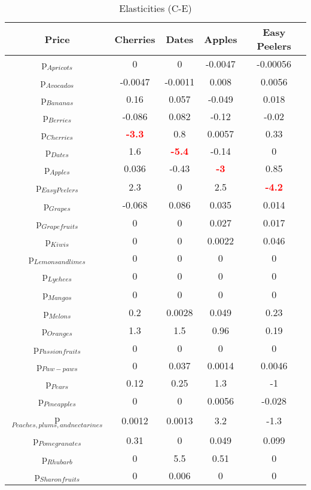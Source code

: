 \documentclass[11pt]{article}
\begin{document}
\begin{table}[h]
\caption{Elasticities (C-E)}
\label{Table: elasticities 2}
\begin{center}
\begin{tabular}{ccccc}
Price & Cherries & Dates & Apples & Easy Peelers \\ \hline
p$_{Apricots}$ & 0 & 0 & -0.0047 & -0.00056 \\ 
p$_{Avocados}$ & -0.0047 & -0.0011 & 0.008 & 0.0056 \\ 
p$_{Bananas}$ & 0.16 & 0.057 & -0.049 & 0.018 \\ 
p$_{Berries}$ & -0.086 & 0.082 & -0.12 & -0.02 \\ 
p$_{Cherries}$ & \textcolor{red}{\textbf{-3.3}} & 0.8 & 0.0057 & 0.33 \\ 
p$_{Dates}$ & 1.6 & \textcolor{red}{\textbf{-5.4}} & -0.14 & 0 \\ 
p$_{Apples}$ & 0.036 & -0.43 & \textcolor{red}{\textbf{-3}} & 0.85 \\ 
p$_{Easy Peelers}$ & 2.3 & 0 & 2.5 & \textcolor{red}{\textbf{-4.2}} \\ 
p$_{Grapes}$ & -0.068 & 0.086 & 0.035 & 0.014 \\ 
p$_{Grapefruits}$ & 0 & 0 & 0.027 & 0.017 \\ 
p$_{Kiwis}$ & 0 & 0 & 0.0022 & 0.046 \\ 
p$_{Lemons and limes}$ & 0 & 0 & 0 & 0 \\ 
p$_{Lychees}$ & 0 & 0 & 0 & 0 \\ 
p$_{Mangos}$ & 0 & 0 & 0 & 0 \\ 
p$_{Melons}$ & 0.2 & 0.0028 & 0.049 & 0.23 \\ 
p$_{Oranges}$ & 1.3 & 1.5 & 0.96 & 0.19 \\ 
p$_{Passion fruits}$ & 0 & 0 & 0 & 0 \\ 
p$_{Paw-paws}$ & 0 & 0.037 & 0.0014 & 0.0046 \\ 
p$_{Pears}$ & 0.12 & 0.25 & 1.3 & -1 \\ 
p$_{Pineapples}$ & 0 & 0 & 0.0056 & -0.028 \\ 
p$_{Peaches, plums, and nectarines}$ & 0.0012 & 0.0013 & 3.2 & -1.3 \\ 
p$_{Pomegranates}$ & 0.31 & 0 & 0.049 & 0.099 \\ 
p$_{Rhubarb}$ & 0 & 5.5 & 0.51 & 0 \\ 
p$_{Sharon fruits}$ & 0 & 0.006 & 0 & 0 \\ 
\end{tabular}
\end{center}
\end{table}
\end{document}
